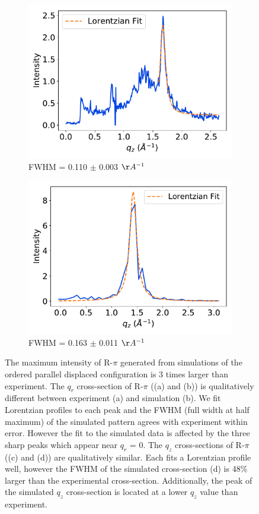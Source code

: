 \documentclass[journal=jpcbfk,manuscript=article]{achemso}
\begin{document}
\begin{figure}
\begin{subfigure}{0.45\textwidth}
  \includegraphics[width=\textwidth]{exp_zsection_fit.pdf}
  \caption{FWHM = 0.110 $\pm$ 0.003 $\AA^{-1}$}\label{fig:exp_zsection_fit}
  \end{subfigure}
  \begin{subfigure}{0.45\textwidth}
  \includegraphics[width=\textwidth]{sim_zsection_fit.pdf}
  \caption{FWHM = 0.163 $\pm$ 0.011 $\AA^{-1}$}\label{fig:sim_zsection_fit}
  \end{subfigure}
  \caption{
  The maximum intensity of R-$\pi$ generated from simulations of the ordered
  parallel displaced configuration is 3 times larger than experiment. The $q_r$
  cross-section of R-$\pi$ ((a) and (b)) is qualitatively different between 
  experiment (a) and simulation (b). We fit Lorentzian profiles to each peak and
  the FWHM (full width at half maximum) of the simulated pattern agrees with experiment within error. However
  the fit to the simulated data is affected by the three sharp peaks which appear
  near $q_r$ = 0. The $q_z$ cross-sections of R-$\pi$ ((c) and (d)) are 
  qualitatively similar. Each fits a Lorentzian profile well, however the FWHM
  of the simulated cross-section (d) is 48\% larger than the experimental 
  cross-section. Additionally, the peak of the simulated $q_z$ cross-section is 
  located at a lower $q_z$ value than experiment.}\label{fig:rpi_exp_comparison}
  \end{figure}
  
\end{document}
